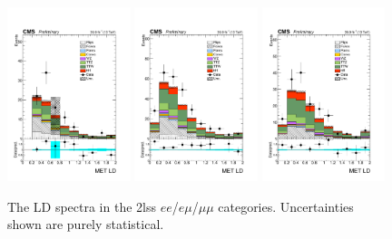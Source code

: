 \begin{figure}[htp]
\centering
\includegraphics[width=0.32\textwidth]{ch5_figs/metLD_ttH_ee_stackPlot_SR.pdf}
\includegraphics[width=0.32\textwidth]{ch5_figs/metLD_ttH_em_stackPlot_SR.pdf}
\includegraphics[width=0.32\textwidth]{ch5_figs/metLD_ttH_mm_stackPlot_SR.pdf} \\
\caption[Data/MC comparison of the \met LD distribution in the signal region]{The \met LD spectra in the 2lss $ee$/$e\mu$/$\mu\mu$ categories. Uncertainties shown are purely statistical.}
\label{fig:sr_metLD}
\end{figure}

